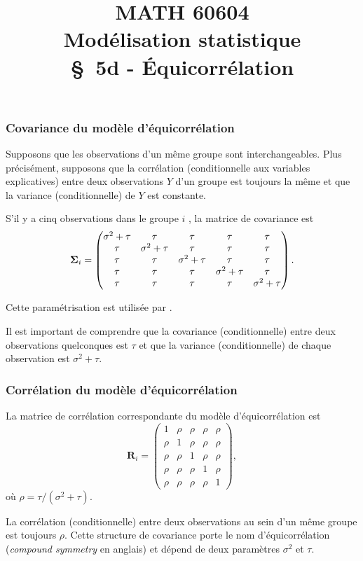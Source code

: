 \documentclass{beamer}
\title[\color{white}{MATH 60604 \S~5d - Équicorrélation}]{\texorpdfstring{MATH 60604 \\Modélisation statistique \\ \S~5d - Équicorrélation}{MATH 60604 \\Modélisation statistique \\ \S~5d - Équicorrélation}}
\author{}
\institute{HEC Montréal\\
Département de sciences de la décision}
\date{}
\begin{document}
\frame{\titlepage}

\begin{frame}
\frametitle{Covariance du modèle d'équicorrélation}
\bi
\item Supposons que les
observations d'un même groupe sont interchangeables. Plus précisément, 
supposons que la corrélation (conditionnelle aux variables explicatives) entre
deux observations $Y$ d'un groupe est toujours la même et que la variance (conditionnelle) de $Y$ est constante.
\item S'il y a cinq observations dans le groupe $i$ , la matrice de covariance est
{\small \[
\boldsymbol {\Sigma}_i=
  \begin{pmatrix}
    \sigma^2+\tau & \tau & \tau & \tau & \tau\\
    \tau & \sigma^2+\tau & \tau& \tau & \tau\\
    \tau & \tau & \sigma^2+\tau & \tau & \tau\\
    \tau & \tau & \tau & \sigma^2+\tau & \tau\\
    \tau & \tau & \tau & \tau & \sigma^2+\tau
  \end{pmatrix}.
\]
}
\item Cette paramétrisation est utilisée par \SASlang{}. 
\item Il est important de comprendre que la covariance
(conditionnelle) entre deux observations quelconques est $\tau$ et que la
variance (conditionnelle) de chaque observation est $\sigma^2+\tau$.
\ei
\end{frame}

\begin{frame}
\frametitle{Corrélation du modèle d'équicorrélation}
La matrice de corrélation correspondante du modèle d'équicorrélation est
\[
\mathbf{R}_i=
  \begin{pmatrix}
   1 & \rho & \rho & \rho & \rho\\
    \rho &1 & \rho & \rho & \rho\\
   \rho & \rho & 1 &\rho & \rho\\
   \rho & \rho & \rho & 1 &\rho\\
   \rho & \rho & \rho & \rho &1
  \end{pmatrix}, 
\]
où $\rho=\tau/(\sigma^2+\tau)$.
\bi
\item La corrélation (conditionnelle) entre deux observations
au sein d'un même groupe est toujours $\rho$. 
Cette structure
de covariance porte le nom \alert{d'équicorrélation} (\textit{compound symmetry} en anglais) et dépend de deux paramètres $\sigma^2$ et $\tau$.
\ei
\end{frame}
\end{document}
